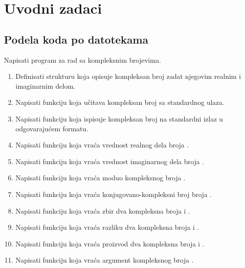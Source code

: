 \renewcommand{\chaptermark}[1]{\markboth{\thechapter\ #1}{#1}}
\renewcommand{\sectionmark}[1]{\markright{\thesection\ #1}}

\chapter{Uvodni zadaci}



\setcounter{page}{1}


\section{Podela koda po datotekama}

\begin{Exercise}[label=1_01] %
Napisati program za rad sa kompleksnim brojevima.
\begin{enumerate}
\item Definisati strukturu  koja opisuje kompleksan broj zadat njegovim realnim i imaginarnim delom.
\item Napisati funkciju  koja učitava kompleksan broj  sa standardnog ulaza.
\item Napisati funkciju  koja ispisuje kompleksan broj  na standardni izlaz u odgovarajućem formatu. 
\item Napisati funkciju  koja vraća vrednost realnog dela broja .
\item Napisati funkciju  koja vraća vrednost imaginarnog dela broja .
\item Napisati funkciju  koja vraća moduo kompleksnog broja .
\item Napisati funkciju  koja vraća konjugovano-kompleksni broj broja .
\item Napisati funkciju  koja vraća zbir dva kompleksna broja  i .
\item Napisati funkciju  koja vraća razliku dva kompleksna broja  i .
\item Napisati funkciju  koja vraća proizvod dva kompleksna broja  i .
\item Napisati funkciju  koja vraća argument kompleksnog broja .
\end{enumerate}


\end{Exercise}
